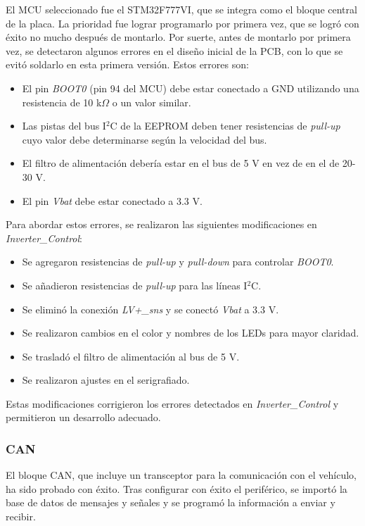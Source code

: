 El MCU seleccionado fue el STM32F777VI, que se integra como el bloque central de la placa. La prioridad fue lograr programarlo por primera vez, que se logró con éxito no mucho después de montarlo. Por suerte, antes de montarlo por primera vez, se detectaron algunos errores en el diseño inicial de la PCB, con lo que se evitó soldarlo en esta primera versión. Estos errores son:
\begin{itemize}
	\item El pin \textit{BOOT0} (pin 94 del MCU) debe estar conectado a GND utilizando una resistencia de 10 k$\Omega$ o un valor similar.
	\item Las pistas del bus I$^2$C de la EEPROM deben tener resistencias de \textit{pull-up} cuyo valor debe determinarse según la velocidad del bus.
	\item El filtro de alimentación debería estar en el bus de 5 V en vez de en el de 20-30 V.
	\item El pin \textit{Vbat} debe estar conectado a 3.3 V.
\end{itemize}

Para abordar estos errores, se realizaron las siguientes modificaciones en \textit{Inverter\_Control}:

\begin{itemize}
	\item Se agregaron resistencias de \textit{pull-up} y \textit{pull-down} para controlar \textit{BOOT0}.
	\item Se añadieron resistencias de \textit{pull-up} para las líneas I$^2$C.
	\item Se eliminó la conexión \textit{LV+\_sns} y se conectó \textit{Vbat} a 3.3 V.
	\item Se realizaron cambios en el color y nombres de los LEDs para mayor claridad.
	\item Se trasladó el filtro de alimentación al bus de 5 V.
	\item Se realizaron ajustes en el serigrafiado.
\end{itemize}

Estas modificaciones corrigieron los errores detectados en \textit{Inverter\_Control} y permitieron un desarrollo adecuado.

\subsubsection{CAN}

El bloque CAN, que incluye un transceptor para la comunicación con el vehículo, ha sido probado con éxito. Tras configurar con éxito el periférico, se importó la base de datos de mensajes y señales y se programó la información a enviar y recibir.

